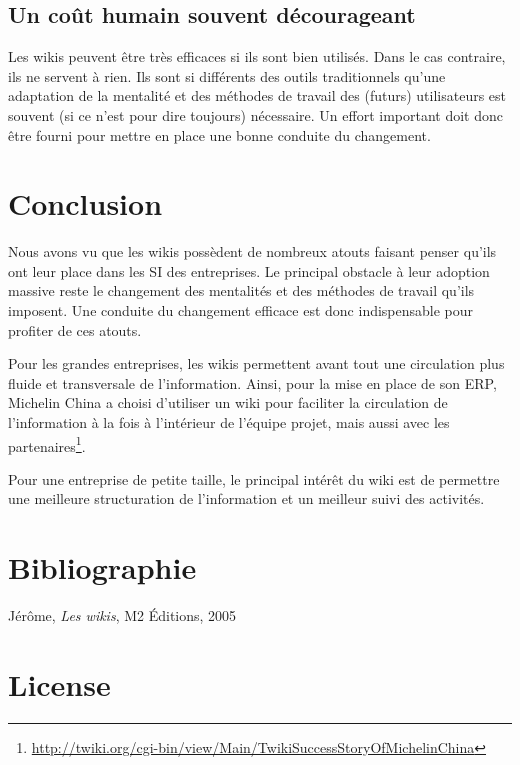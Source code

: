 \documentclass{article}
\begin{document}
\subsection{Un coût humain souvent décourageant}
Les wikis peuvent être très efficaces si ils sont bien utilisés. Dans le cas contraire, ils ne servent à rien. Ils sont si différents des outils traditionnels qu'une adaptation de la mentalité et des méthodes de travail des (futurs) utilisateurs est souvent (si ce n'est pour dire toujours) nécessaire. Un effort important doit donc être fourni pour mettre en place une bonne conduite du changement.


\section*{Conclusion}
Nous avons vu que les wikis possèdent de nombreux atouts faisant penser qu'ils ont leur place dans les SI des entreprises. Le principal obstacle à leur adoption massive reste le changement des mentalités et des méthodes de travail qu'ils imposent. Une conduite du changement efficace est donc indispensable pour profiter de ces atouts.

Pour les grandes entreprises, les wikis permettent avant tout une circulation plus fluide et transversale de l'information. Ainsi, pour la mise en place de son ERP, Michelin China a choisi d'utiliser un wiki pour faciliter la circulation de l'information à la fois à l'intérieur de l'équipe projet, mais aussi avec les partenaires\footnote{\url{http://twiki.org/cgi-bin/view/Main/TwikiSuccessStoryOfMichelinChina}}.

Pour une entreprise de petite taille, le principal intérêt du wiki est de permettre une meilleure structuration de l'information et un meilleur suivi des activités.


\section*{Bibliographie}
 Jérôme, \emph{Les wikis}, M2 Éditions, 2005


\section*{License}\label{sec:license}
\end{document}
